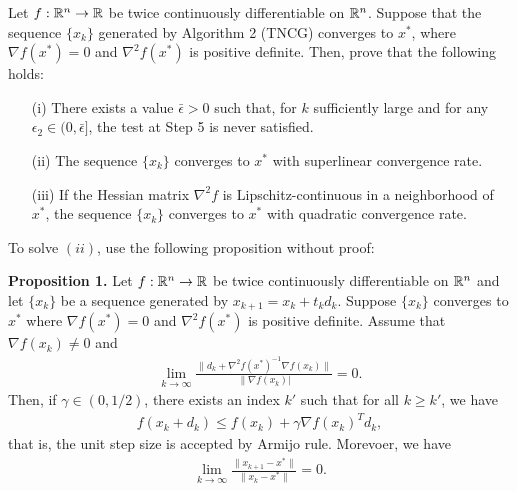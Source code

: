 \documentclass{ExerciseSheet}
\newif\ifsolutions
\begin{document}
\fi



\vskip 0.5cm

\begin{problem}
    Let $f:\mathbb{R}^n\rightarrow \mathbb{R}$ be twice continuously differentiable on $\mathbb{R}^n$. Suppose that the sequence $\{x_k\}$ generated by Algorithm 2 (TNCG) converges to $x^*$, where $\nabla f(x^*)=0$ and $\nabla^2 f(x^*)$ is positive definite. Then, prove that the following holds:
    \begin{itemize}
        \item[(i)] There exists a value $\bar{\epsilon}>0$ such that, for $k$ sufficiently large and for any $\epsilon_2 \in (0,\bar{\epsilon}]$, the test at Step 5 is never satisfied.
        \item[(ii)] The sequence $\{x_k\}$ converges to $x^*$ with superlinear convergence rate.
        \item[(iii)] If the Hessian matrix $\nabla^2 f$ is Lipschitz-continuous in a neighborhood of $x^*$, the sequence $\{x_k\}$ converges to $x^*$ with quadratic convergence rate.
    \end{itemize}
    To solve $(ii)$, use the following proposition without proof:
\end{problem}
\noindent \textbf{Proposition 1.} Let $f:\mathbb{R}^n\rightarrow \mathbb{R}$ be twice continuously differentiable on $\mathbb{R}^n$ and let $\{x_k\}$ be a sequence generated by $x_{k+1}=x_k+t_kd_k$. Suppose $\{x_k\}$ converges to $x^*$ where $\nabla f(x^*)=0$ and $\nabla^2 f(x^*)$ is positive definite. Assume that $\nabla f(x_k)\not=0$ and 
\begin{align}\label{eq: condition}
    \lim_{k\rightarrow \infty} \frac{\lVert d_k+\nabla^2 f(x^*)^{-1}\nabla f(x_k)\rVert}{\lVert \nabla f(x_k)\rvert}=0.
\end{align}
Then, if $\gamma \in (0,1/2)$, there exists an index $k'$ such that for all $k\geq k'$, we have
\begin{align*}
    f(x_k+d_k) \leq f(x_k) + \gamma \nabla f(x_k)^T d_k,
\end{align*}
that is, the unit step size is accepted by Armijo rule. Morevoer, we have
\begin{align*}
    \lim_{k\rightarrow \infty}\frac{\lVert x_{k+1}-x^*\rVert}{\lVert x_k-x^*\rVert}=0.
\end{align*}
\ifsolutions
\vskip 0.3cm
\end{document}
